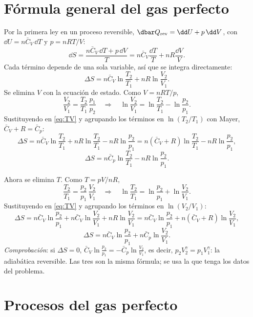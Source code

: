 \documentclass[11pt,a4paper]{article}
\newcommand{\Cv}{\bar C_V}
\newcommand{\Cp}{\bar C_p}
\begin{document}
\section{Fórmula general del gas perfecto}

Por la primera ley en un proceso reversible, $\dbar Q_{\mathrm{rev}}=\dd U+p\,\dd V$, con $\dd U=n\Cv\,\dd T$ y
$p=nRT/V$:
\[
  \dd S=\frac{n\Cv\,\dd T+p\,\dd V}{T}=n\Cv\frac{\dd T}{T}+nR\frac{\dd V}{V}.
\]
Cada término depende de una sola variable, así que se integra directamente:
\begin{equation}\label{eq:TV}
  \Delta S=n\Cv\ln\frac{T_2}{T_1}+nR\ln\frac{V_2}{V_1}.
\end{equation}
 Se elimina $V$ con la ecuación de estado. Como $V=nRT/p$,
\[
  \frac{V_2}{V_1}=\frac{T_2}{T_1}\,\frac{p_1}{p_2}\quad\Longrightarrow\quad
  \ln\frac{V_2}{V_1}=\ln\frac{T_2}{T_1}-\ln\frac{p_2}{p_1}.
\]
Sustituyendo en \eqref{eq:TV} y agrupando los términos en $\ln(T_2/T_1)$ con Mayer, $\Cv+R=\Cp$:
\[
  \Delta S=n\Cv\ln\frac{T_2}{T_1}+nR\ln\frac{T_2}{T_1}-nR\ln\frac{p_2}{p_1}
  =n(\Cv+R)\ln\frac{T_2}{T_1}-nR\ln\frac{p_2}{p_1},
\]
\begin{equation}\label{eq:Tp}
  \Delta S=n\Cp\ln\frac{T_2}{T_1}-nR\ln\frac{p_2}{p_1}.
\end{equation}

 Ahora se elimina $T$. Como $T=pV/nR$,
\[
  \frac{T_2}{T_1}=\frac{p_2}{p_1}\,\frac{V_2}{V_1}\quad\Longrightarrow\quad
  \ln\frac{T_2}{T_1}=\ln\frac{p_2}{p_1}+\ln\frac{V_2}{V_1}.
\]
Sustituyendo en \eqref{eq:TV} y agrupando los términos en $\ln(V_2/V_1)$:
\[
  \Delta S=n\Cv\ln\frac{p_2}{p_1}+n\Cv\ln\frac{V_2}{V_1}+nR\ln\frac{V_2}{V_1}
  =n\Cv\ln\frac{p_2}{p_1}+n(\Cv+R)\ln\frac{V_2}{V_1},
\]
\begin{equation}\label{eq:pV}
  \Delta S=n\Cv\ln\frac{p_2}{p_1}+n\Cp\ln\frac{V_2}{V_1}.
\end{equation}
\emph{Comprobación}: si $\Delta S=0$, $\Cv\ln\frac{p_2}{p_1}=-\Cp\ln\frac{V_2}{V_1}$, es decir,
$p_2V_2^{\gamma}=p_1V_1^{\gamma}$: la adiabática reversible.
Las tres son la misma fórmula; se usa la que tenga los datos del problema.

\section{Procesos del gas perfecto}
\end{document}
